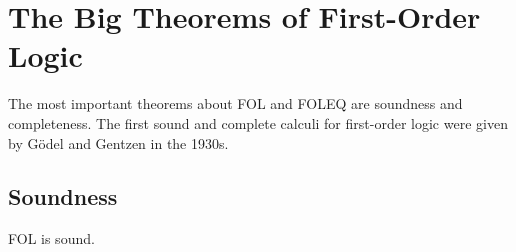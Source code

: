 \section{The Big Theorems of First-Order Logic}

The most important theorems about FOL and FOLEQ are soundness and completeness.
The first sound and complete calculi for first-order logic were given by G\"odel \cite{goedelcompleteness} and Gentzen \cite{gentzen} in the 1930s.

\subsection{Soundness}

\begin{theorem}
FOL is sound.
\end{theorem}
